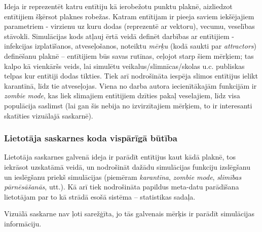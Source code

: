 Ideja ir reprezentēt katru entītiju kā ierobežotu punktu plaknē, aizliedzot entītijiem šķērsot
plaknes robežas. Katram entītijam ir pieeja saviem iekšējajiem parametriem - virzienu
uz kuru dodas (reprezentē ar vektoru), vecumu, veselības stāvokli. Simulācijas
kods atļauj ērtā veidā definēt darbības ar entītijiem - infekcijas izplatīšanos,
atveseļošanos, noteiktu \emph{mērķu} (kodā saukti par \emph{attractors}) definēšanu
plaknē -- entītijiem būs savas rutīnas, ceļojot starp šiem mērķiem; tas kalpo kā
vienkāršs veids, lai simulētu veikalus/slimnīcas/skolas u.c. publiskas telpas
kur entītiji dodas tikties. Tiek arī nodrošināta iespēja slimos entītijus
ielikt karantīnā, līdz tie atveseļojas. Viena no darba autora iecienītākajām
funkcijām ir \emph{zombie mode}, kas liek slimajiem entītijiem dzīties
pakaļ veselajiem, līdz visa populācija saslimst (lai gan šis nebija no izvirzītajiem
mērķiem, to ir interesanti skatīties vizuālajā saskarnē).

\subsubsection*{Lietotāja saskarnes koda vispārīgā būtība}

Lietotāja saskarnes galvenā ideja ir parādīt entītijus kaut kādā plaknē, tos
iekrāsot uzskatāmā veidā, un nodrošināt dažādu simulācijas funkciju izslēgšanu
un ieslēgšanu priekš simulācijas (piemēram \emph{karantīna}, \emph{zombie mode},
\emph{slimības pārnēsāšanās}, utt.). Kā arī tiek nodrošināta papildus meta-datu
parādīšana lietotājam par to kā strādā esošā sistēma -- statistikas sadaļa.

Vizuālā saskarne nav ļoti sarežģīta, jo tās galvenais mērķis ir parādīt simulācijas
informāciju.
